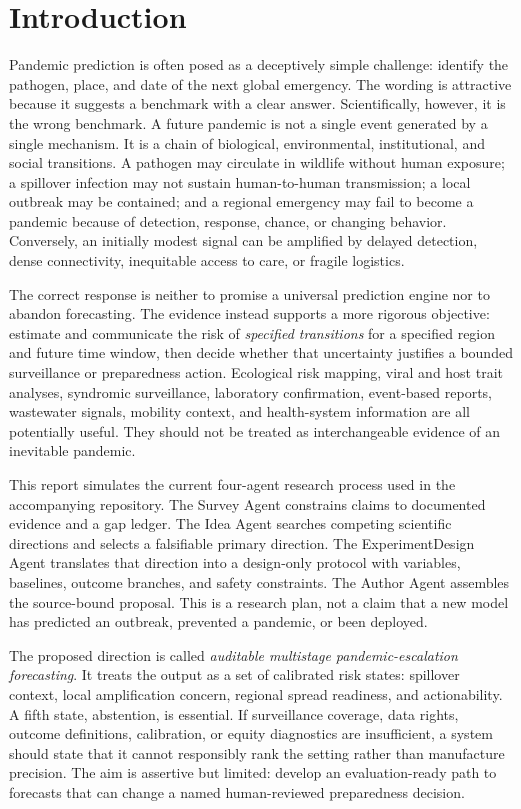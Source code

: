 \documentclass[conference]{IEEEtran}
\begin{document}
\section{Introduction}

Pandemic prediction is often posed as a deceptively simple challenge: identify the pathogen, place, and date of the next global emergency. The wording is attractive because it suggests a benchmark with a clear answer. Scientifically, however, it is the wrong benchmark. A future pandemic is not a single event generated by a single mechanism. It is a chain of biological, environmental, institutional, and social transitions. A pathogen may circulate in wildlife without human exposure; a spillover infection may not sustain human-to-human transmission; a local outbreak may be contained; and a regional emergency may fail to become a pandemic because of detection, response, chance, or changing behavior. Conversely, an initially modest signal can be amplified by delayed detection, dense connectivity, inequitable access to care, or fragile logistics.

The correct response is neither to promise a universal prediction engine nor to abandon forecasting. The evidence instead supports a more rigorous objective: estimate and communicate the risk of \emph{specified transitions} for a specified region and future time window, then decide whether that uncertainty justifies a bounded surveillance or preparedness action. Ecological risk mapping, viral and host trait analyses, syndromic surveillance, laboratory confirmation, event-based reports, wastewater signals, mobility context, and health-system information are all potentially useful. They should not be treated as interchangeable evidence of an inevitable pandemic.

This report simulates the current four-agent research process used in the accompanying repository. The Survey Agent constrains claims to documented evidence and a gap ledger. The Idea Agent searches competing scientific directions and selects a falsifiable primary direction. The ExperimentDesign Agent translates that direction into a design-only protocol with variables, baselines, outcome branches, and safety constraints. The Author Agent assembles the source-bound proposal. This is a research plan, not a claim that a new model has predicted an outbreak, prevented a pandemic, or been deployed.

The proposed direction is called \emph{auditable multistage pandemic-escalation forecasting}. It treats the output as a set of calibrated risk states: spillover context, local amplification concern, regional spread readiness, and actionability. A fifth state, abstention, is essential. If surveillance coverage, data rights, outcome definitions, calibration, or equity diagnostics are insufficient, a system should state that it cannot responsibly rank the setting rather than manufacture precision. The aim is assertive but limited: develop an evaluation-ready path to forecasts that can change a named human-reviewed preparedness decision.
\end{document}
